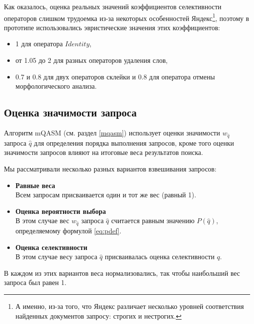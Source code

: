 \documentclass{article}
\begin{document}
  Как оказалось, оценка реальных значений коэффициентов селективности
  операторов слишком трудоемка из-за некоторых особенностей Яндекс\footnote{
      А именно, из-за того, что
      Яндекс различает несколько уровней соответствия найденных документов запросу:
      строгих и нестрогих.
  },
  поэтому в прототипе использовались эвристические значения этих коэффициентов: 
  \begin{itemize}
  \item 1 для оператора $Identity$,
  \item от 1.05 до 2 для разных операторов удаления слов,
  \item 0.7 и 0.8 для двух операторов склейки и 0.8 для оператора отмены морфологического анализа. 
  \end{itemize}


\subsection{Оценка значимости запроса} \label{queryweights}

Алгоритм mQASM (см. раздел \ref{mqasm})
использует оценки значимости $w_{\hat{q}}$ запроса $\hat{q}$ 
для определения порядка выполнения запросов,
кроме того оценки значимости запросов влияют на итоговые веса результатов поиска.

Мы рассматривали несколько разных вариантов взвешивания запросов: 

\begin{itemize}
\item {\bf Равные веса}\\
  Всем запросам присваивается один и тот же вес (равный 1).
\item {\bf Оценка вероятности выбора}\\
  В этом случае вес $w_{\hat{q}}$ запроса $\hat{q}$ считается равным значению
 $P(\hat{q})$, определяемому формулой \ref{eq:pdef}.
\item {\bf Оценка селективности}\\
  В этом случае весу запроса $\hat{q}$ присваивалась оценка селективности $\hat{q}$.
\end{itemize}

В каждом из этих вариантов веса нормализовались,
так чтобы наибольший вес запроса был равен 1.
\end{document}
